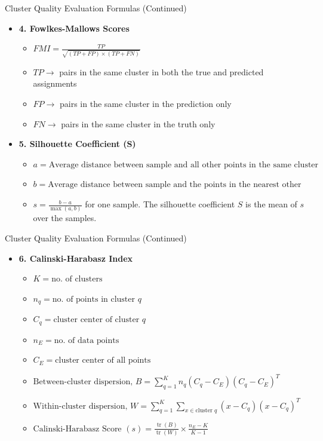 \documentclass[aspectratio=169,xcolor=dvipsnames,svgnames,x11names,fleqn]{beamer}
\begin{document}
\begin{frame}{Cluster Quality Evaluation Formulas (Continued)}
    \begin{itemize}

    \item \textbf{4. Fowlkes-Mallows Scores}
    \begin{itemize}
        \item $FMI = \frac{TP}{\sqrt{(TP + FP) \times (TP + FN)}}$
       \item $TP \rightarrow$ pairs in the same cluster in both the true and predicted assignments
\item $FP \rightarrow$ pairs in the same cluster in the prediction only
\item $FN \rightarrow$ pairs in the same cluster in the truth only
    \end{itemize}
    \item \textbf{5. Silhouette Coefficient (S)}
    \begin{itemize}
        \item $a = \text{Average distance between sample and all other points in the same cluster}$
        \item $b = \text{Average distance between sample and the points in the nearest other cluster}$
\item $s = \frac{b - a}{\max(a, b)}$ for one sample. The silhouette coefficient $S$ is the mean of $s$ over the samples.
    \end{itemize}
\end{itemize}
\end{frame}

\begin{frame}{Cluster Quality Evaluation Formulas (Continued)}
\begin{itemize}
    \item \textbf{6. Calinski-Harabasz Index}
    \begin{itemize}
        \item $K = \text{no. of clusters}$
        \item $n_q = \text{no. of points in cluster } q$
        \item $C_q = \text{cluster center of cluster } q$
        \item $n_E = \text{no. of data points}$
        \item $C_E = \text{cluster center of all points}$
       \item $\text{Between-cluster dispersion, } B = \sum_{q=1}^{K} n_q (C_q - C_E) (C_q - C_E)^T$
\item $\text{Within-cluster dispersion, } W = \sum_{q=1}^{K} \sum_{x \in \text{cluster } q} (x - C_q) (x - C_q)^T$
\item $\text{Calinski-Harabasz Score } (s) = \frac{\operatorname{tr}(B)}{\operatorname{tr}(W)} \times \frac{n_E - K}{K - 1}$
    \end{itemize}
\end{itemize}
\end{frame}
\end{document}
